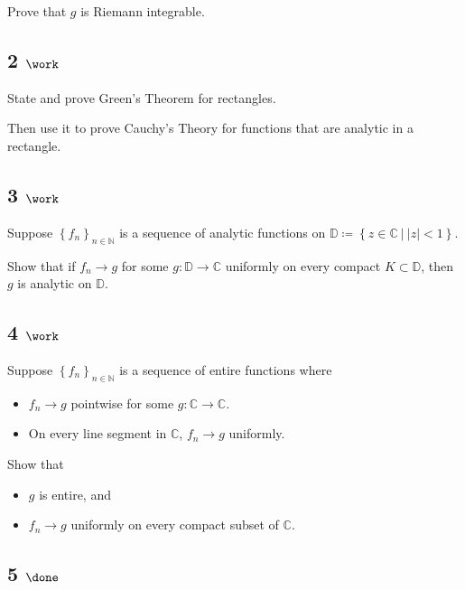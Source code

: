 Prove that \(g\) is Riemann integrable.

\hypertarget{work-17}{%
\subsection{\texorpdfstring{2
\(\work\)}{2 \textbackslash work}}\label{work-17}}

State and prove Green's Theorem for rectangles.

Then use it to prove Cauchy's Theory for functions that are analytic in
a rectangle.

\hypertarget{work-18}{%
\subsection{\texorpdfstring{3
\(\work\)}{3 \textbackslash work}}\label{work-18}}

Suppose \(\left\{{f_n}\right\}_{n\in {\mathbb{N}}}\) is a sequence of
analytic functions on
\({\mathbb{D}}\coloneqq\left\{{z\in {\mathbb{C}}{~\mathrel{\Big|}~}{\left\lvert {z} \right\rvert} < 1}\right\}\).

Show that if \(f_n\to g\) for some \(g: {\mathbb{D}}\to {\mathbb{C}}\)
uniformly on every compact \(K\subset {\mathbb{D}}\), then \(g\) is
analytic on \({\mathbb{D}}\).

\hypertarget{work-19}{%
\subsection{\texorpdfstring{4
\(\work\)}{4 \textbackslash work}}\label{work-19}}

Suppose \(\left\{{f_n}\right\}_{n\in {\mathbb{N}}}\) is a sequence of
entire functions where

\begin{itemize}
\tightlist
\item
  \(f_n \to g\) pointwise for some \(g:{\mathbb{C}}\to{\mathbb{C}}\).
\item
  On every line segment in \({\mathbb{C}}\), \(f_n \to g\) uniformly.
\end{itemize}

Show that

\begin{itemize}
\tightlist
\item
  \(g\) is entire, and
\item
  \(f_n\to g\) uniformly on every compact subset of \({\mathbb{C}}\).
\end{itemize}

\hypertarget{done}{%
\subsection{\texorpdfstring{5
\(\done\)}{5 \textbackslash done}}\label{done}}

